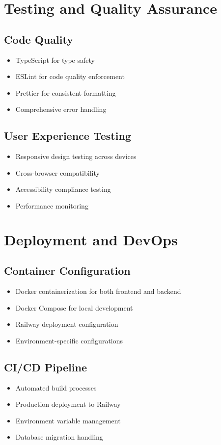 \documentclass[12pt,a4paper]{article}
\begin{document}
\section{Testing and Quality Assurance}

\subsection{Code Quality}
\begin{itemize}
    \item TypeScript for type safety
    \item ESLint for code quality enforcement
    \item Prettier for consistent formatting
    \item Comprehensive error handling
\end{itemize}

\subsection{User Experience Testing}
\begin{itemize}
    \item Responsive design testing across devices
    \item Cross-browser compatibility
    \item Accessibility compliance testing
    \item Performance monitoring
\end{itemize}

\section{Deployment and DevOps}

\subsection{Container Configuration}
\begin{itemize}
    \item Docker containerization for both frontend and backend
    \item Docker Compose for local development
    \item Railway deployment configuration
    \item Environment-specific configurations
\end{itemize}

\subsection{CI/CD Pipeline}
\begin{itemize}
    \item Automated build processes
    \item Production deployment to Railway
    \item Environment variable management
    \item Database migration handling
\end{itemize}
\end{document}
